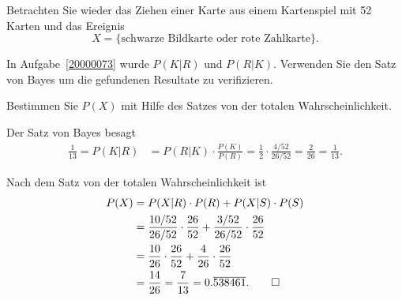 Betrachten Sie wieder das Ziehen einer Karte aus einem Kartenspiel
mit 52 Karten und das Ereignis
\[
X
=
\{
\text{schwarze Bildkarte oder rote Zahlkarte}
\}.
\]

\begin{teilaufgaben}
\item
In Aufgabe~\ref{20000073} wurde $P(K|R)$ und $P(R|K)$.
Verwenden Sie den Satz von Bayes um die gefundenen Resultate zu
verifizieren.
\item
Bestimmen Sie $P(X)$ mit Hilfe des Satzes von der totalen Wahrscheinlichkeit.
\end{teilaufgaben}

\begin{loesung}
\begin{teilaufgaben}
\item
Der Satz von Bayes besagt
\begin{align*}
\frac{1}{13}
=
P(K|R)
&=
P(R|K)\cdot \frac{P(K)}{P(R)}
=
\frac{1}{2}
\cdot
\frac{4/52}{26/52}
=
\frac{2}{26}
=
\frac{1}{13}.
\end{align*}
\item
Nach dem Satz von der totalen Wahrscheinlichkeit ist
\begin{align*}
P(X)
&=
P(X|R) \cdot P(R) + P(X|S) \cdot P(S)
\\
&=
\frac{10/52}{26/52}\cdot \frac{26}{52}
+
\frac{3/52}{26/52}\cdot \frac{26}{52}
\\
&=
\frac{10}{26} \cdot \frac{26}{52}
+
\frac{4}{26} \cdot \frac{26}{52}
\\
&=
\frac{14}{26}
=
\frac{7}{13}
=
0.\overline{538461}.
\qedhere
\end{align*}
\end{teilaufgaben}
\end{loesung}

